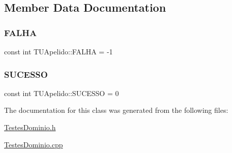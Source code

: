 \subsection{Member Data Documentation}
\mbox{\label{class_t_u_apelido_afdc614cde9b44f65a445dbaf41142698}} 
\subsubsection{\texorpdfstring{F\+A\+L\+HA}{FALHA}}
{\footnotesize\ttfamily const int T\+U\+Apelido\+::\+F\+A\+L\+HA = -\/1\hspace{0.3cm}{\ttfamily [static]}}

\mbox{\label{class_t_u_apelido_aa100f19a4867e7bf07c49161bb2efef0}} 
\subsubsection{\texorpdfstring{S\+U\+C\+E\+S\+SO}{SUCESSO}}
{\footnotesize\ttfamily const int T\+U\+Apelido\+::\+S\+U\+C\+E\+S\+SO = 0\hspace{0.3cm}{\ttfamily [static]}}



The documentation for this class was generated from the following files\+:\begin{DoxyCompactItemize}
\item 
\hyperlink{_testes_dominio_8h}{Testes\+Dominio.\+h}\item 
\hyperlink{_testes_dominio_8cpp}{Testes\+Dominio.\+cpp}\end{DoxyCompactItemize}
